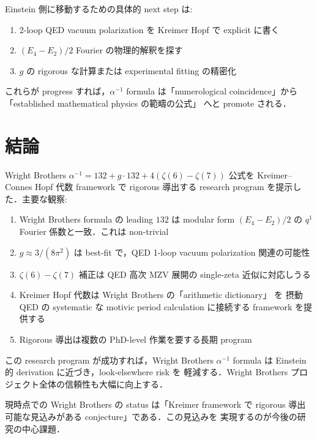 \documentclass[11pt,a4paper]{article}
\begin{document}
Einstein 側に移動するための具体的 next step は:
\begin{enumerate}
\item 2-loop QED vacuum polarization を Kreimer Hopf で explicit に書く
\item $(E_4 - E_2)/2$ Fourier の物理的解釈を探す
\item $g$ の rigorous な計算または experimental fitting の精密化
\end{enumerate}

これらが progress すれば，$\alpha^{-1}$ formula は「numerological
coincidence」から「established mathematical physics の範疇の公式」
へと promote される．

\section{結論}

Wright Brothers $\alpha^{-1} = 132 + g \cdot 132 + 4(\zeta(6) - \zeta(7))$
公式を Kreimer--Connes Hopf 代数 framework で rigorous 導出する
research program を提示した．主要な観察:

\begin{enumerate}
\item Wright Brothers formula の leading $132$ は modular form
$(E_4 - E_2)/2$ の $q^1$ Fourier 係数と一致．これは non-trivial
\item $g \approx 3/(8\pi^2)$ は best-fit で，QED 1-loop vacuum
polarization 関連の可能性
\item $\zeta(6) - \zeta(7)$ 補正は QED 高次 MZV 展開の single-zeta
近似に対応しうる
\item Kreimer Hopf 代数は Wright Brothers の「arithmetic dictionary」
を 摂動 QED の systematic な motivic period calculation に接続する
framework を提供する
\item Rigorous 導出は複数の PhD-level 作業を要する長期 program
\end{enumerate}

この research program が成功すれば，Wright Brothers $\alpha^{-1}$
formula は Einstein 的 derivation に近づき，look-elsewhere risk を
軽減する．Wright Brothers プロジェクト全体の信頼性も大幅に向上する．

現時点での Wright Brothers の status は「Kreimer framework で
rigorous 導出可能な見込みがある conjecture」である．この見込みを
実現するのが今後の研究の中心課題．
\end{document}
